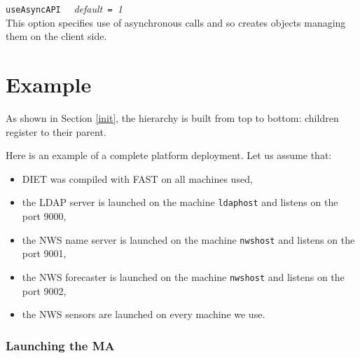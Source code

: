 \noindent
\texttt{useAsyncAPI} \ \ \emph{default}\texttt{ = }\emph{1}\\
This option specifies use of asynchronous calls and so creates objects managing them on the client side.

\section{Example}
\label{sec:deploy_ex}

As shown in Section \ref{init}, the hierarchy is built from top to
bottom: children register to their parent.

Here is an example of a complete platform deployment. Let us assume that:

\begin{itemize}
\item DIET was compiled with FAST on all machines used,
\item the LDAP server is launched on the machine \texttt{ldaphost} and listens
  on the port 9000,
\item the NWS name server is launched on the machine \texttt{nwshost} and
  listens on the port 9001,
\item the NWS forecaster is launched on the machine \texttt{nwshost} and
  listens on the port 9002,
\item the NWS sensors are launched on every machine we use.
\end{itemize}


\subsubsection{Launching the MA}

